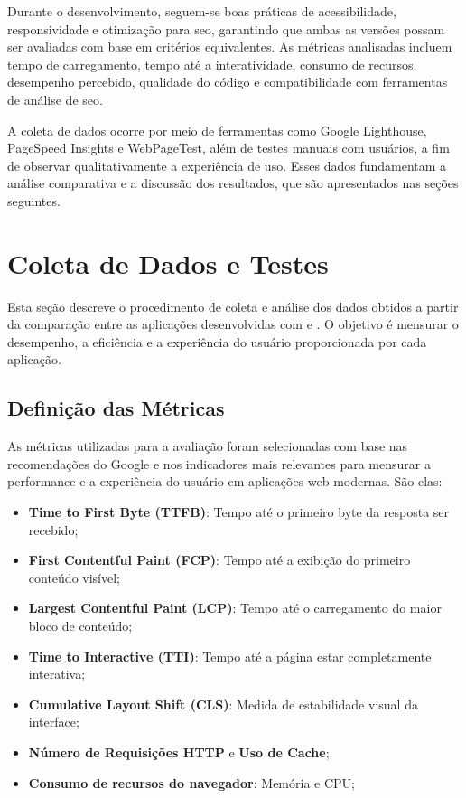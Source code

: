 Durante o desenvolvimento, seguem-se boas práticas de acessibilidade, responsividade e otimização para \acrshort{seo}, garantindo que ambas as versões possam ser avaliadas com base em critérios equivalentes. As métricas analisadas incluem tempo de carregamento, tempo até a interatividade, consumo de recursos, desempenho percebido, qualidade do código e compatibilidade com ferramentas de análise de \acrshort{seo}.

A coleta de dados ocorre por meio de ferramentas como Google Lighthouse, PageSpeed Insights e WebPageTest, além de testes manuais com usuários, a fim de observar qualitativamente a experiência de uso. Esses dados fundamentam a análise comparativa e a discussão dos resultados, que são apresentados nas seções seguintes.

\section{Coleta de Dados e Testes}
\label{sec:coleta-de-dados-e-testes}

Esta seção descreve o procedimento de coleta e análise dos dados obtidos a partir da comparação entre as aplicações desenvolvidas com  e . O objetivo é mensurar o desempenho, a eficiência e a experiência do usuário proporcionada por cada aplicação.

\subsection{Definição das Métricas}

As métricas utilizadas para a avaliação foram selecionadas com base nas recomendações do Google e nos indicadores mais relevantes para mensurar a performance e a experiência do usuário em aplicações web modernas. São elas:

\begin{itemize}
    \item \textbf{Time to First Byte (TTFB)}: Tempo até o primeiro byte da resposta ser recebido;
    \item \textbf{First Contentful Paint (FCP)}: Tempo até a exibição do primeiro conteúdo visível;
    \item \textbf{Largest Contentful Paint (LCP)}: Tempo até o carregamento do maior bloco de conteúdo;
    \item \textbf{Time to Interactive (TTI)}: Tempo até a página estar completamente interativa;
    \item \textbf{Cumulative Layout Shift (CLS)}: Medida de estabilidade visual da interface;
    \item \textbf{Número de Requisições HTTP} e \textbf{Uso de Cache};
    \item \textbf{Consumo de recursos do navegador}: Memória e CPU;
\end{itemize}

